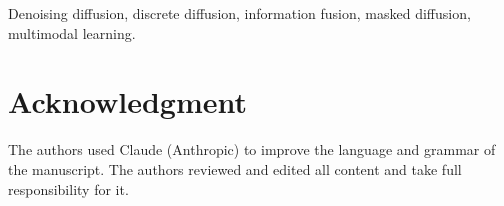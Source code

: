 \documentclass[lettersize,journal]{IEEEtran}   %
\newif\ifanon      \anontrue
\newif\ifbios      \biosfalse   %
\newif\ifplaceholder \placeholderfalse
\theoremstyle{plain}
\theoremstyle{definition}
\theoremstyle{remark}
\begin{document}
\begin{IEEEkeywords}
Denoising diffusion, discrete diffusion, information fusion, masked diffusion, multimodal learning.
\end{IEEEkeywords}





\section*{Acknowledgment}
\ifanon\else The authors thank ANONYMIZED, ANONYMIZED, for providing support to carry out this research work. \fi
The authors used Claude (Anthropic) to improve the language and grammar of the manuscript.
The authors reviewed and edited all content and take full responsibility for it.

\ifplaceholder\nocite{*}\fi


\ifanon\else\ifbios\fi\fi
\end{document}
